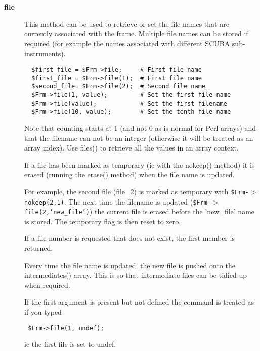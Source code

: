 \begin{description}

\item[\textbf{file}] \mbox{}

This method can be used to retrieve or set the file names that are 
currently associated with the frame. Multiple file names can be stored
if required (for example the names associated with different 
SCUBA sub-instruments).

\begin{verbatim}
  $first_file = $Frm->file;     # First file name
  $first_file = $Frm->file(1);  # First file name
  $second_file= $Frm->file(2);  # Second file name
  $Frm->file(1, value);         # Set the first file name
  $Frm->file(value);            # Set the first filename
  $Frm->file(10, value);        # Set the tenth file name
\end{verbatim}


Note that counting starts at 1 (and not 0 as is normal for Perl 
arrays) and that the filename can not be an integer (otherwise
it will be treated as an array index). Use files() to retrieve
all the values in an array context.



If a file has been marked as temporary (ie with the nokeep()
method) it is erased (running the erase() method) when the file
name is updated.



For example, the second file (file\_2) is marked as temporary
with \texttt{\$Frm-$>$nokeep(2,1)}. The next time the filename is updated
(\texttt{\$Frm-$>$file(2,'new\_file')}) the current file is erased before the
'new\_file' name is stored. The temporary flag is then reset to
zero.



If a file number is requested that does not exist, the first
member is returned.



Every time the file name is updated, the new file is pushed onto
the intermediates() array. This is so that intermediate files
can be tidied up when required.



If the first argument is present but not defined the command is
treated as if you typed

\begin{verbatim}
 $Frm->file(1, undef);
\end{verbatim}


ie the first file is set to undef.



\end{description}
